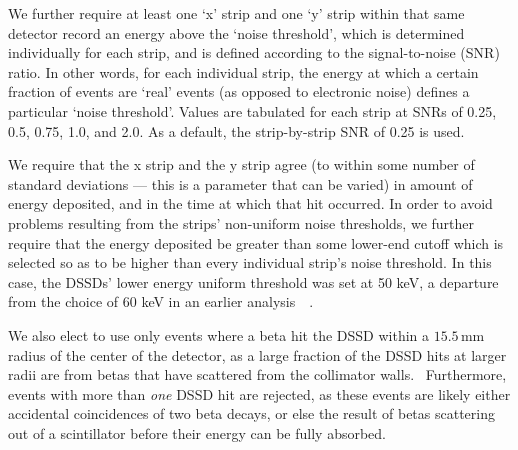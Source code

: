 	We further require at least one `x' strip and one `y' strip within that same detector record an energy above the `noise threshold', which is determined individually for each strip, and is defined according to the signal-to-noise (SNR) ratio.  In other words, for each individual strip, the energy at which a certain fraction of events are `real' events (as opposed to electronic noise) defines a particular `noise threshold'.  Values are tabulated for each strip at SNRs of 0.25, 0.5, 0.75, 1.0, and 2.0.  As a default, the strip-by-strip SNR of 0.25 is used.~  


	We require that the x strip and the y strip agree (to within some number of standard deviations --- this is a parameter that can be varied) in amount of energy deposited, and in the time at which that hit occurred.  In order to avoid problems resulting from the strips' non-uniform noise thresholds, we further require that the energy deposited be greater than some lower-end cutoff which is selected so as to be higher than every individual strip's noise threshold.  In this case, the DSSDs' lower energy uniform threshold was set at 50 keV, a departure from the choice of 60 keV in an earlier analysis~\cite{ben_Abeta}~\cite{ben_thesis}.


We also elect to use only events where a beta hit the DSSD within a $15.5\,$mm radius of the center of the detector, as a large fraction of the DSSD hits at larger radii are from betas that have scattered from the collimator walls.~ Furthermore, events with more than \emph{one} DSSD hit are rejected, as these events are likely either accidental coincidences of two beta decays, or else the result of betas scattering out of a scintillator before their energy can be fully absorbed.  




